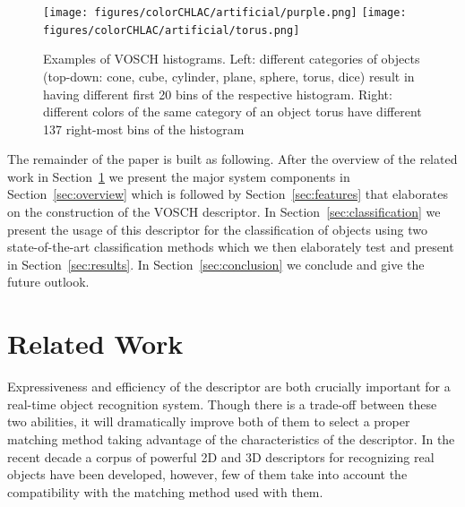 \documentclass[conference]{sty/IEEEtran}
\begin{document}
\begin{figure}[htb!]
  \begin{center}
    \texttt{[image: figures/colorCHLAC/artificial/purple.png]}
    \texttt{[image: figures/colorCHLAC/artificial/torus.png]}
    \caption{Examples of  VOSCH histograms.
Left: different categories of objects (top-down: cone, cube, cylinder, plane, sphere, torus, dice) 
result in having different first 20 bins of the respective histogram.
Right: different colors of the same category of an object torus have different 137 right-most bins of the histogram}
    \label{fig:grsd_cchlac}
  \end{center}
\end{figure}

The remainder of the paper is built as following. After the overview of the related
work in Section~\ref{sec:rl} we present the major system components in Section~\ref{sec:overview}
which is followed by Section~\ref{sec:features} that elaborates on the construction of the
VOSCH descriptor. In Section~\ref{sec:classification} we present the usage of this descriptor
for the classification of objects using two state-of-the-art classification methods which we
then elaborately test and present in Section~\ref{sec:results}. In Section~\ref{sec:conclusion}
we conclude and give the future outlook.



\section{Related Work}
\label{sec:rl}
Expressiveness and efficiency of the descriptor are both crucially important for
a real-time object recognition system.  Though there is a trade-off between
these two abilities, it will dramatically improve both of them to select a
proper matching method taking advantage of the characteristics of the
descriptor. In the recent decade a corpus of powerful 2D and 3D descriptors for
recognizing real objects have been developed, however, few of them take into
account the compatibility with the matching method used with them.
\end{document}
